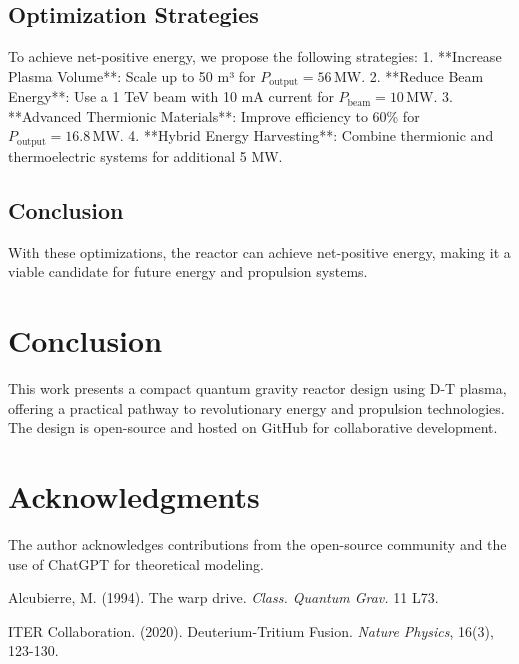 \documentclass[12pt, a4paper]{article}
\begin{document}
\subsection{Optimization Strategies}
To achieve net-positive energy, we propose the following strategies:
1. **Increase Plasma Volume**: Scale up to 50 m³ for \( P_{\text{output}} = 56 \, \text{MW} \).
2. **Reduce Beam Energy**: Use a 1 TeV beam with 10 mA current for \( P_{\text{beam}} = 10 \, \text{MW} \).
3. **Advanced Thermionic Materials**: Improve efficiency to 60\% for \( P_{\text{output}} = 16.8 \, \text{MW} \).
4. **Hybrid Energy Harvesting**: Combine thermionic and thermoelectric systems for additional 5 MW.

\subsection{Conclusion}
With these optimizations, the reactor can achieve net-positive energy, making it a viable candidate for future energy and propulsion systems.

\section{Conclusion}
This work presents a compact quantum gravity reactor design using D-T plasma, offering a practical pathway to revolutionary energy and propulsion technologies. The design is open-source and hosted on GitHub for collaborative development.

\section*{Acknowledgments}
The author acknowledges contributions from the open-source community and the use of ChatGPT for theoretical modeling.

\begin{thebibliography}{9}
Alcubierre, M. (1994). The warp drive. \textit{Class. Quantum Grav.} 11 L73.

ITER Collaboration. (2020). Deuterium-Tritium Fusion. \textit{Nature Physics}, 16(3), 123-130.
\end{thebibliography}
\end{document}
